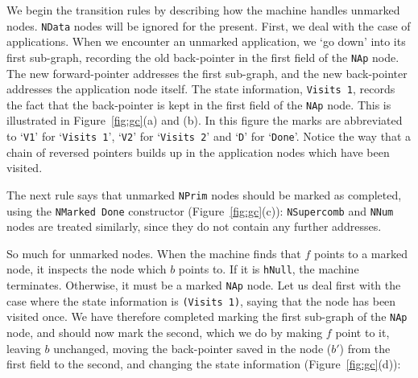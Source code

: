 We begin the transition rules by describing how the machine handles
unmarked nodes.  \mbox{\tt NData} nodes will be ignored for the present.
First, we deal with the case of applications.  When we encounter an
unmarked application, we `go down' into its first sub-graph,
recording the old back-pointer in the first field of the \mbox{\tt NAp} node.
The new forward-pointer addresses the first sub-graph, and the
new back-pointer addresses the application node itself.
The state information, \mbox{\tt Visits\ 1}, records the fact that the back-pointer
is kept in the first field of the \mbox{\tt NAp} node.
This is illustrated in Figure~\ref{fig:gc}(a) and (b).  In this figure the
marks are abbreviated to `\mbox{\tt V1}' for `\mbox{\tt Visits\ 1}', `\mbox{\tt V2}' for
`\mbox{\tt Visits\ 2}' and `\mbox{\tt D}' for `\mbox{\tt Done}'.  Notice the way that
a chain of reversed pointers builds up in the application nodes which
have been visited.

The next rule says that unmarked \mbox{\tt NPrim} nodes should be marked as completed,
using the \mbox{\tt NMarked\ Done} constructor (Figure~\ref{fig:gc}(c)):
\mbox{\tt NSupercomb} and \mbox{\tt NNum} nodes are treated similarly, since they
do not contain any further addresses.

So much for unmarked nodes.  When the machine finds that $f$ points to
a marked node, it inspects the node which $b$ points to.  If it is \mbox{\tt hNull},
the machine terminates.  Otherwise, it must be a
marked \mbox{\tt NAp} node.  Let us deal first with the case where the
state information is \mbox{\tt (Visits\ 1)}, saying that the node has been
visited once. We have therefore completed marking the first sub-graph
of the \mbox{\tt NAp} node, and should now mark the second, which we do by making
$f$ point to it, leaving $b$ unchanged, moving the back-pointer saved
in the node ($b'$) from the first field to the second, and changing the state
information (Figure~\ref{fig:gc}(d)):

